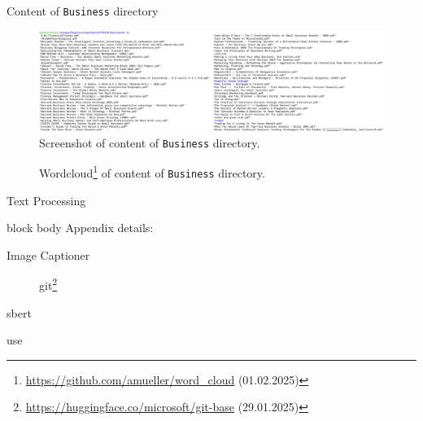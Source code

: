 \begin{frame}{Content of \texttt{Business} directory}
     {
        \begin{figure}
            \includegraphics[width=\textwidth]{images/data_screenshots/business.png}
            \caption{Screenshot of content of \texttt{Business} directory.}
            \label{fig:business_dir_content}
        \end{figure}
    }
     {
        \begin{figure}
            
            \caption{Wordcloud\footnote{\url{https://github.com/amueller/word_cloud} (01.02.2025)} of content of \texttt{Business} directory.}
            \label{fig:business_dir_content_wordcloud}
        \end{figure}
    }
\end{frame}

\begin{frame}{Text Processing}
    
      \vfill
    \begin{beamercolorbox}[center, wd=\linewidth, sep=1ex, rounded=true, shadow=true]{block body}
        {\small Appendix details: } 
        \hyperlink{supp:img_cap}{}
        \hspace{1em}
        \hyperlink{supp:sbert}{}
    \end{beamercolorbox}
\end{frame}

\begin{frame}{Image Captioner~\parencite{git_2022}}
    \label{supp:img_cap}
    \begin{figure}
        
        \caption{\ac{git}\footnote{\url{https://huggingface.co/microsoft/git-base} (29.01.2025)}}
    \end{figure}
\end{frame}

\begin{frame}{\ac{sbert}~\parencite{sbert_2019}}
    \label{supp:sbert}
    
\end{frame}

\begin{frame}{\ac{use}~\parencite{use_2019}}
    \label{supp:use}
    
\end{frame}